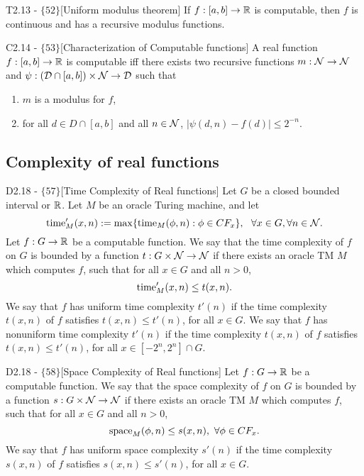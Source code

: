 \documentclass{article}
\begin{document}
\begin{flexitheorem}{T2.13 - $\{52\}$}[Uniform modulus theorem]
    If $f : [a,b] \to \mathbb{R}$ is computable, then $f$ is continuous and has a recursive modulus functions.
\end{flexitheorem}

\begin{flexitheorem}{C2.14 - $\{53\}$}[Characterization of Computable functions]
    A real function $f:[a,b] \to \mathbb{R}$ is computable iff there exists two recursive functions $m : \mathcal{N} \to \mathcal{N}$ and $\psi : (\mathcal{D} \cap [a,b]) \times \mathcal{N} \to \mathcal{D}$ such that 
    \begin{enumerate}[label = (\roman*)]
        \item $m$ is a modulus for $f$,
        \item for all $d \in D \cap [a,b]$ and all $n \in \mathcal{N}$, $|\psi(d,n) - f(d)| \leq 2^{-n}$.
    \end{enumerate}
\end{flexitheorem}

\subsection{Complexity of real functions}

\begin{flexidefinition}{D2.18 - $\{57\}$}[Time Complexity of Real functions]
    Let $G$ be a closed bounded interval or $\mathbb{R}$. Let $M$ be an oracle Turing machine, and let 
    \begin{equation}
        \operatorname{time}'_M(x,n) := \max \{\operatorname{time}_M(\phi,n) : \phi \in CF_x \}, 
        \ \ \forall x \in G, \forall n \in \mathcal{N}.
    \end{equation}
    Let $f : G \to \mathbb{R}$ be a computable function. We say that the time complexity of $f$ on $G$ is bounded by a function $t : G \times \mathcal{N} \to \mathcal{N}$ if there exists an oracle TM $M$ which computes $f$, such that for all $x \in G$ and all $n > 0$,
    \begin{equation}
        \operatorname{time}'_M(x,n) \leq t(x,n).
    \end{equation}
    We say that $f$ has uniform time complexity $t'(n)$ if the time complexity $t(x,n)$ of $f$ satisfies $t(x,n) \leq t'(n)$, for all $x \in G$. We say that $f$ has nonuniform time complexity $t'(n)$ if the time complexity $t(x,n)$ of $f$ satisfies $t(x,n) \leq t'(n)$, for all $x \in [-2^n,2^n] \cap G$. 
\end{flexidefinition}

\begin{flexidefinition}{D2.18 - $\{58\}$}[Space Complexity of Real functions]
    Let $f : G \to \mathbb{R}$ be a computable function. We say that the space complexity of $f$ on $G$ is bounded by a function $s : G \times \mathcal{N} \to \mathcal{N}$ if there exists an oracle TM $M$ which computes $f$, such that for all $x \in G$ and all $n > 0$,
    \begin{equation}
        \operatorname{space}_M(\phi,n) \leq s(x,n), \ \forall \phi \in CF_x.
    \end{equation}
    We say that $f$ has uniform space complexity $s'(n)$ if the time complexity $s(x,n)$ of $f$ satisfies $s(x,n) \leq s'(n)$, for all $x \in G$.
\end{flexidefinition}
\end{document}

